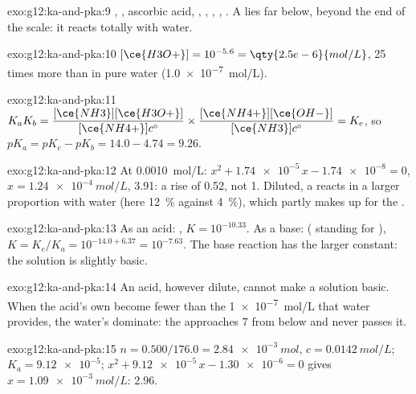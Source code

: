 \begin{solution}{exo:g12:ka-and-pka:9}
, , ascorbic acid, , ,
, , . A  lies far below,
beyond the end of the scale: it reacts totally with water.
\end{solution}

\begin{solution}{exo:g12:ka-and-pka:10}
$[\ce{H3O+}] = 10^{-5.6} = \qty{2.5e-6}{mol/L}$, 25 times more than in
pure water (\qty{1.0e-7}{mol/L}).
\end{solution}

\begin{solution}{exo:g12:ka-and-pka:11}
$K_a K_b = \dfrac{[\ce{NH3}][\ce{H3O+}]}{[\ce{NH4+}]c^\circ} \times
\dfrac{[\ce{NH4+}][\ce{OH-}]}{[\ce{NH3}]c^\circ} = K_e$, so
$pK_a = pK_e - pK_b = 14.0 - 4.74 = 9.26$.
\end{solution}

\begin{solution}{exo:g12:ka-and-pka:12}
At \qty{0.0010}{mol/L}: $x^2 + \num{1.74e-5}\,x - \num{1.74e-8} = 0$,
$x = \qty{1.24e-4}{mol/L}$,  3.91: a rise of 0.52, not 1. Diluted, a
 reacts in a larger proportion with water (here
\qty{12}{\percent} against \qty{4}{\percent}), which partly makes up for
the .
\end{solution}

\begin{solution}{exo:g12:ka-and-pka:13}
As an acid: , $K = 10^{-10.33}$. As a
base:  ( standing for ), $K = K_e/K_a = 10^{-14.0+6.37}
= 10^{-7.63}$. The base reaction has the larger constant: the solution
is slightly basic.
\end{solution}

\begin{solution}{exo:g12:ka-and-pka:14}
An acid, however dilute, cannot make a solution basic. When the acid's
own  become fewer than the \qty{1e-7}{mol/L} that water
provides, the water's  dominate: the  approaches 7 from below and
never passes it.
\end{solution}

\begin{solution}{exo:g12:ka-and-pka:15}
$n = 0.500 / 176.0 = \qty{2.84e-3}{mol}$, $c = \qty{0.0142}{mol/L}$;
$K_a = \num{9.12e-5}$; $x^2 + \num{9.12e-5}\,x - \num{1.30e-6} = 0$ gives
$x = \qty{1.09e-3}{mol/L}$:  2.96.
\end{solution}

